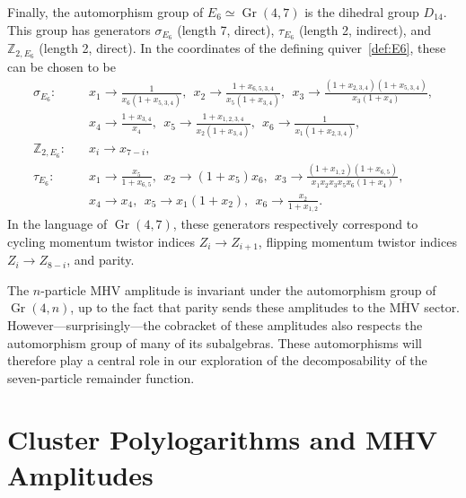 \documentclass[11pt]{article}
\DeclareMathOperator{\Gr}{Gr}
\begin{document}
Finally, the automorphism group of $E_6 \simeq \Gr(4,7)$ is the dihedral group $D_{14}$. This group has generators $\sigma_{E_6}$ (length 7, direct), $\tau_{E_6}$ (length 2, indirect), and $\mathbb{Z}_{2,E_6}$ (length 2, direct). In the coordinates of the defining quiver~\eqref{def:E6}, these can be chosen to be 
\begin{equation}
\begin{split}
  \sigma_{E_6}:\quad& 
    x_1\to \frac{1}{x_6 (1+x_{5,3,4})},~~
    x_2\to \frac{1+x_{6,5,3,4}}{x_5 (1+x_{3,4})},~~
    x_3\to \frac{(1+x_{2,3,4}) (1+x_{5,3,4})}{x_3 (1+x_4)},\\&
    x_4\to \frac{1+x_{3,4}}{x_4},~~
    x_5\to \frac{1+x_{1,2,3,4}}{x_2 (1+x_{3,4})},~~
    x_6\to \frac{1}{x_1 (1+x_{2,3,4})},\\[2ex]
  \mathbb{Z}_{2,E_6}:\quad& 
    x_i\to x_{7-i},\\[2ex]
  \tau_{E_6}:\quad& 
    x_1\to \frac{x_5}{1+x_{6,5}},~~
    x_2\to (1+x_5) x_6,~~
    x_3\to \frac{(1+x_{1,2}) (1+x_{6,5})}{x_1 x_2 x_3 x_5 x_6 (1+x_4)},\\&
    x_4\to x_4,~~
    x_5\to x_1 (1+x_2),~~
    x_6\to \frac{x_2}{1+x_{1,2}}.
\end{split}  
\end{equation}
In the language of $\Gr(4,7)$, these generators respectively correspond to cycling momentum twistor indices $Z_i \to Z_{i+1}$, flipping momentum twistor indices $Z_i \to Z_{8-i}$, and parity. 

The $n$-particle MHV amplitude is invariant under the automorphism group of $\Gr(4,n)$, up to the fact that parity sends these amplitudes to the $\overline{\text{MHV}}$ sector. However---surprisingly---the cobracket of these amplitudes also respects the automorphism group of many of its subalgebras. These automorphisms will therefore play a central role in our exploration of the decomposability of the seven-particle remainder function.

\section{Cluster Polylogarithms and MHV Amplitudes} \label{sec:cluster_polylog_MHV_review}
\end{document}
